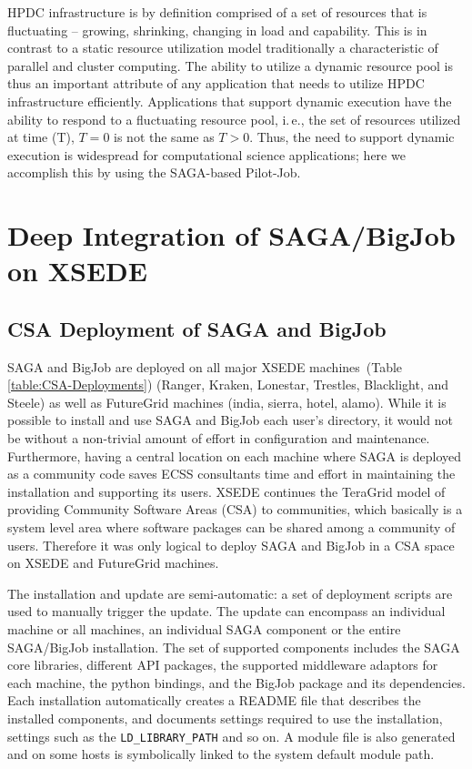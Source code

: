 \documentclass{sig-alternate}
\begin{document}
HPDC infrastructure is by definition comprised of a set of resources
that is fluctuating -- growing, shrinking, changing in load and
capability. This is in contrast to a static resource utilization model
traditionally a characteristic of parallel and cluster computing. The
ability to utilize a dynamic resource pool is thus an important
attribute of any application that needs to utilize HPDC infrastructure
efficiently. Applications that support dynamic execution have the
ability to respond to a fluctuating resource pool, i.\,e., the set of
resources utilized at time (T), $T=0$ is not the same as $T>0$.  Thus,
the need to support dynamic execution is widespread for computational
science applications; here we accomplish this by using the SAGA-based
Pilot-Job.

\section{Deep Integration of SAGA/BigJob on XSEDE}

\subsection{CSA Deployment of SAGA and BigJob}
 \label{ssec:csa}
 
SAGA and BigJob are deployed on all major XSEDE
machines~(Table \ref{table:CSA-Deployments}) (Ranger,
Kraken, Lonestar, Trestles, Blacklight, and Steele) as well as FutureGrid machines
(india, sierra, hotel, alamo). While it is possible to install and
use SAGA and BigJob each user's directory, it would not be without a non-trivial
amount of effort in configuration and maintenance. Furthermore, having a
central location on each machine where SAGA is deployed as a community code
saves ECSS consultants time and effort in maintaining the installation and
supporting its users. XSEDE continues the TeraGrid model of providing Community
Software Areas (CSA) to communities, which basically is a system
level area where software packages can be shared among a community of users.
Therefore it was only logical to deploy SAGA and BigJob in a CSA space on XSEDE
and FutureGrid machines.

The installation and update are semi-automatic: a set of deployment
scripts are used to manually trigger the update. The update can encompass an
individual machine or all machines, an individual SAGA component or the entire
SAGA/BigJob installation. The set of supported components includes the SAGA core
libraries, different API packages, the supported
middleware adaptors for each machine, the python bindings, and the
BigJob package and its dependencies. Each installation automatically creates a
README file that describes the installed components, and documents settings
required to use the installation, settings such as the
\texttt{LD\_LIBRARY\_PATH} and so on. A module file is also generated and on
some hosts is symbolically linked to the system default module path. 
\end{document}
